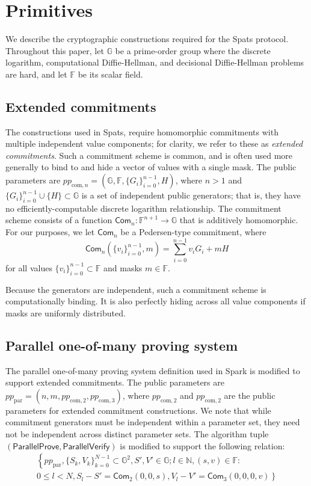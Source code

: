 \documentclass{article}
\newcommand{\G}{\mathbb{G}}
\newcommand{\F}{\mathbb{F}}
\newcommand{\func}[1]{\mathsf{#1}}
\newcommand{\com}{\func{Com}}
\begin{document}
\section{Primitives}

We describe the cryptographic constructions required for the Spats protocol.
Throughout this paper, let $\G$ be a prime-order group where the discrete logarithm, computational Diffie-Hellman, and decisional Diffie-Hellman problems are hard, and let $\F$ be its scalar field.


\subsection{Extended commitments}

The constructions used in Spats, require homomorphic commitments with multiple independent value components; for clarity, we refer to these as \textit{extended commitments}.
Such a commitment scheme is common, and is often used more generally to bind to and hide a vector of values with a single mask.
The public parameters are $pp_{\text{com},n} = (\G, \F, \{G_i\}_{i=0}^{n-1}, H)$, where $n > 1$ and $\{G_i\}_{i=0}^{n-1} \cup \{H\} \subset \G$ is a set of independent public generators; that is, they have no efficiently-computable discrete logarithm relationship.
The commitment scheme consists of a function $\com_n: \F^{n+1} \to \G$ that is additively homomorphic.
For our purposes, we let $\com_n$ be a Pedersen-type commitment, where $$\com_n(\{v_i\}_{i=0}^{n-1}, m) = \sum_{i=0}^{n-1} v_i G_i + mH$$ for all values $\{v_i\}_{i=0}^{n-1} \subset \F$ and masks $m \in \F$.

Because the generators are independent, such a commitment scheme is computationally binding.
It is also perfectly hiding across all value components if masks are uniformly distributed.


\subsection{Parallel one-of-many proving system}

The parallel one-of-many proving system definition used in Spark is modified to support extended commitments.
The public parameters are $pp_{\text{par}} = (n, m, pp_{\text{com},2}, pp_{\text{com},3})$, where $pp_{\text{com},2}$ and $pp_{\text{com},2}$ are the public parameters for extended commitment constructions.
We note that while commitment generators must be independent within a parameter set, they need not be independent across distinct parameter sets.
The algorithm tuple $(\func{ParallelProve}, \func{ParallelVerify})$ is modified to support the following relation:
\begin{multline*}
\left\{ pp_{\text{par}}, \{S_k,V_k\}_{k=0}^{N-1} \subset \G^2, S',V' \in \G ; l \in \mathbb{N}, (s,v) \in \F : \right. \\
\left. 0 \leq l < N, S_l - S' = \com_2(0,0,s), V_l - V' = \com_3(0,0,0,v) \right\}
\end{multline*}
\end{document}
